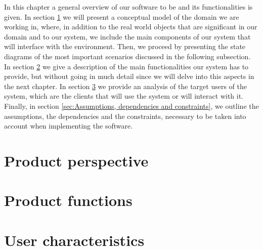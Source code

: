 In this chapter a general overview of our software to be and its functionalities is given. In section \ref{sec:product_perspective} we will present a conceptual model of the domain we are working in, where, in addition to the real world objects that are significant in our domain and to our system, we include the main components of our system that will interface with the environment. Then, we proceed by presenting the state diagrams of the most important scenarios discussed in the following subsection. In section \ref{sec:Product functions} we give a description of the main functionalities our system has to provide, but without going in much detail since we will delve into this aspects in the next chapter. In section \ref{sec:User_characteristics} we provide an analysis of the target users of the system, which are the clients that will use the system or will interact with it. Finally, in section \ref{sec:Assumptions, dependencies and constraints}, we outline the assumptions, the dependencies and the constraints, necessary to be taken into account when implementing the software.
\section{Product perspective}
\label{sec:product_perspective}%


\section{Product functions}
\label{sec:Product functions}%


\section{User characteristics}
\label{sec:User_characteristics}%


\clearpage
